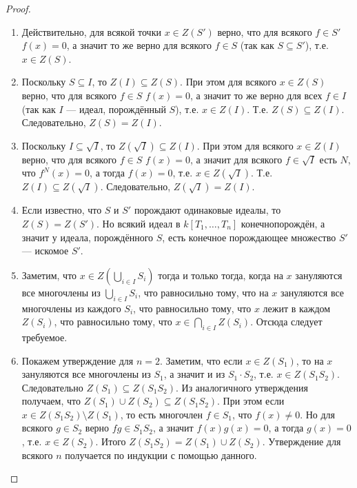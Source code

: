 \documentclass[12pt,a4paper]{article}
\begin{document}
    \begin{proof}
        \begin{enumerate}
            \item Действительно, для всякой точки $x \in Z(S')$ верно, что для всякого $f \in S'$ $f(x) = 0$, а значит то же верно для всякого $f \in S$ (так как $S \subseteq S'$), т.е. $x \in Z(S)$.
            \item Поскольку $S \subseteq I$, то $Z(I) \subseteq Z(S)$. При этом для всякого $x \in Z(S)$ верно, что для всякого $f \in S$ $f(x) = 0$, а значит то же верно для всех $f \in I$ (так как $I$ --- идеал, порождённый $S$), т.е. $x \in Z(I)$. Т.е. $Z(S) \subseteq Z(I)$. Следовательно, $Z(S) = Z(I)$.
            \item Поскольку $I \subseteq \sqrt{I}$, то $Z(\sqrt{I}) \subseteq Z(I)$. При этом для всякого $x \in Z(I)$ верно, что для всякого $f \in S$ $f(x) = 0$, а значит для всякого $f \in \sqrt{I}$ есть $N$, что $f^N(x) = 0$, а тогда $f(x) = 0$, т.е. $x \in Z(\sqrt{I})$. Т.е. $Z(I) \subseteq Z(\sqrt{I})$. Следовательно, $Z(\sqrt{I}) = Z(I)$.
            \item Если известно, что $S$ и $S'$ порождают одинаковые идеалы, то $Z(S) = Z(S')$. Но всякий идеал в $k[T_1, \dots, T_n]$ конечнопорождён, а значит у идеала, порождённого $S$, есть конечное порождающее множество $S'$ --- искомое $S'$.
            \item Заметим, что $x \in Z(\bigcup_{i \in I} S_i)$ тогда и только тогда, когда на $x$ зануляются все многочлены из $\bigcup_{i \in I} S_i$, что равносильно тому, что на $x$ зануляются все многочлены из каждого $S_i$, что равносильно тому, что $x$ лежит в каждом $Z(S_i)$, что равносильно тому, что $x \in \bigcap_{i \in I} Z(S_i)$. Отсюда следует требуемое.
            \item Покажем утверждение для $n = 2$. Заметим, что если $x \in Z(S_1)$, то на $x$ зануляются все многочлены из $S_1$, а значит и из $S_1 \cdot S_2$, т.е. $x \in Z(S_1 S_2)$. Следовательно $Z(S_1) \subseteq Z(S_1 S_2)$. Из аналогичного утверждения получаем, что $Z(S_1) \cup Z(S_2) \subseteq Z(S_1 S_2)$. При этом если $x \in Z(S_1 S_2) \setminus Z(S_1)$, то есть многочлен $f \in S_1$, что $f(x) \neq 0$. Но для всякого $g \in S_2$ верно $fg \in S_1 S_2$, а значит $f(x)g(x) = 0$, а тогда $g(x) = 0$, т.е. $x \in Z(S_2)$. Итого $Z(S_1 S_2) = Z(S_1) \cup Z(S_2)$. Утверждение для всякого $n$ получается по индукции с помощью данного.
        \end{enumerate}
    \end{proof}
\end{document}
